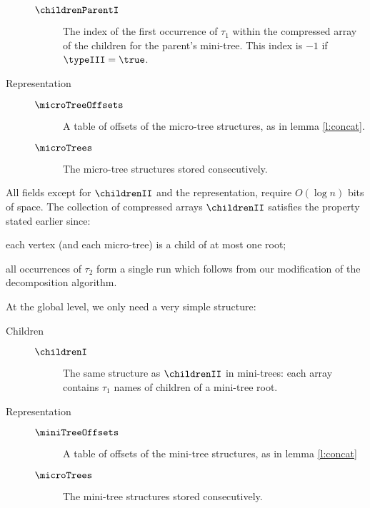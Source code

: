 \begin{description}
\begin{description}
		\item[$\childrenParentI$]
		The index of the first occurrence of $\tau_1$ within the compressed array of the children for the parent's mini-tree.
		This index is $-1$ if $\typeIII = \true$.
	\end{description}
	
	\item[Representation]
	\begin{description}
		\item[]
	
		\item[$\microTreeOffsets$]
		A table of offsets of the micro-tree structures, as in lemma \ref{l:concat}.
		
		\item[$\microTrees$]
		The micro-tree structures stored consecutively.
	\end{description}
\end{description}

All fields except for $\childrenII$ and the representation, require $O(\log n)$ bits of space.
The collection of compressed arrays $\childrenII$ satisfies the property stated earlier since:
\begin{enuminline}
	\item each vertex (and each micro-tree) is a child of at most one root;
	\item all occurrences of $\tau_2$ form a single run which follows from our modification of the decomposition algorithm.
\end{enuminline}

\bigbreak

At the global level, we only need a very simple structure:
\begin{description}
	\item[Children]
	\begin{description}
		\item[]
		\item[$\childrenI$]
		The same structure as $\childrenII$ in mini-trees: each array contains $\tau_1$ names of children of a mini-tree root.
	\end{description}

	\item[Representation]
	\begin{description}
		\item[]
	
		\item[$\miniTreeOffsets$]
		A table of offsets of the mini-tree structures, as in lemma \ref{l:concat}
		
		\item[$\microTrees$]
		The mini-tree structures stored consecutively.
	\end{description}
\end{description}


